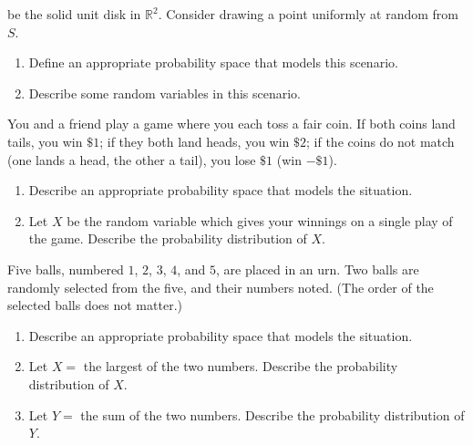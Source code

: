 \documentclass[12pt,reqno]{amsart}
\begin{document}
be the solid unit disk in $\mathbb{R}^2$. Consider drawing a point uniformly at random from $S$.

\medskip
\begin{enumerate}
\item Define an appropriate probability space that models this scenario.\vfill
\item Describe some random variables in this scenario.\vfill
\end{enumerate}



























\bigskip
\prob You and a friend play a game where you each toss a fair coin. If both coins land tails, you win $\$1$; if they both land heads, you win $\$2$; if the coins do not match (one lands a head, the other a tail), you lose $\$1$ (win $-\$1$).

\medskip
\begin{enumerate}
\item Describe an appropriate probability space that models the situation.\vfill
\item Let $X$ be the random variable which gives your winnings on a single play of the game. Describe the probability distribution of $X$.\vfill
\end{enumerate}























\newpage
\prob Five balls, numbered $1$, $2$, $3$, $4$, and $5$, are placed in an urn. Two balls are randomly selected from the five, and their numbers noted. (The order of the selected balls does not matter.)

\medskip
\begin{enumerate}
\item Describe an appropriate probability space that models the situation.\vfill
\item Let $X = $ the largest of the two numbers. Describe the probability distribution of $X$.\vfill
\item Let $Y = $ the sum of the two numbers. Describe the probability distribution of $Y$.\vfill
\end{enumerate}
\end{document}
